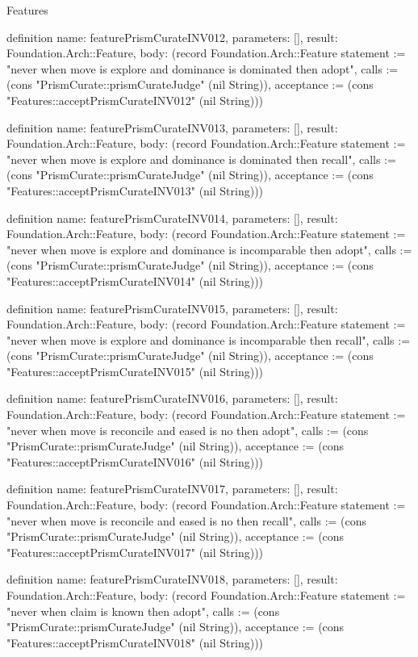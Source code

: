 \begin{lexlean}{Features}
\begin{semanticmodule}
definition{
  name: featurePrismCurateINV012,
  parameters: [],
  result: Foundation.Arch::Feature,
  body: (record Foundation.Arch::Feature {statement := "never when move is explore and dominance is dominated then adopt", calls := (cons "PrismCurate::prismCurateJudge" (nil String)), acceptance := (cons "Features::acceptPrismCurateINV012" (nil String))})
}

definition{
  name: featurePrismCurateINV013,
  parameters: [],
  result: Foundation.Arch::Feature,
  body: (record Foundation.Arch::Feature {statement := "never when move is explore and dominance is dominated then recall", calls := (cons "PrismCurate::prismCurateJudge" (nil String)), acceptance := (cons "Features::acceptPrismCurateINV013" (nil String))})
}

definition{
  name: featurePrismCurateINV014,
  parameters: [],
  result: Foundation.Arch::Feature,
  body: (record Foundation.Arch::Feature {statement := "never when move is explore and dominance is incomparable then adopt", calls := (cons "PrismCurate::prismCurateJudge" (nil String)), acceptance := (cons "Features::acceptPrismCurateINV014" (nil String))})
}

definition{
  name: featurePrismCurateINV015,
  parameters: [],
  result: Foundation.Arch::Feature,
  body: (record Foundation.Arch::Feature {statement := "never when move is explore and dominance is incomparable then recall", calls := (cons "PrismCurate::prismCurateJudge" (nil String)), acceptance := (cons "Features::acceptPrismCurateINV015" (nil String))})
}

definition{
  name: featurePrismCurateINV016,
  parameters: [],
  result: Foundation.Arch::Feature,
  body: (record Foundation.Arch::Feature {statement := "never when move is reconcile and eased is no then adopt", calls := (cons "PrismCurate::prismCurateJudge" (nil String)), acceptance := (cons "Features::acceptPrismCurateINV016" (nil String))})
}

definition{
  name: featurePrismCurateINV017,
  parameters: [],
  result: Foundation.Arch::Feature,
  body: (record Foundation.Arch::Feature {statement := "never when move is reconcile and eased is no then recall", calls := (cons "PrismCurate::prismCurateJudge" (nil String)), acceptance := (cons "Features::acceptPrismCurateINV017" (nil String))})
}

definition{
  name: featurePrismCurateINV018,
  parameters: [],
  result: Foundation.Arch::Feature,
  body: (record Foundation.Arch::Feature {statement := "never when claim is known then adopt", calls := (cons "PrismCurate::prismCurateJudge" (nil String)), acceptance := (cons "Features::acceptPrismCurateINV018" (nil String))})
}


\end{semanticmodule}
\end{lexlean}
